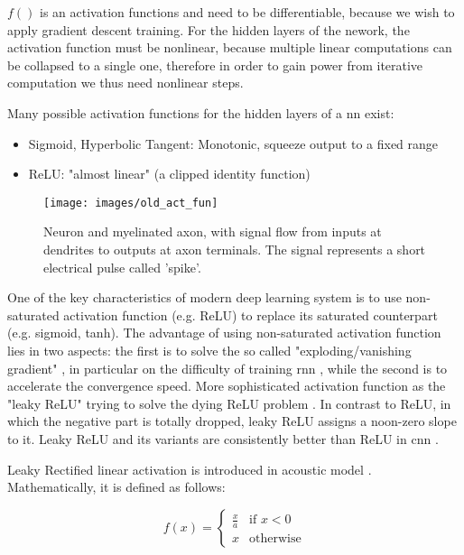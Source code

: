 \noindent $f()$ is an activation functions and need to be differentiable, because we wish to apply gradient descent training. For the hidden layers of the nework, the activation function must be nonlinear, because multiple linear computations can be collapsed to a single one, therefore in order to gain power from iterative computation we thus need nonlinear steps.

\noindent Many possible activation functions for the hidden layers of a \gls{nn} exist:
\begin{itemize}
	\item Sigmoid, Hyperbolic Tangent: Monotonic, squeeze output to a fixed range
	\item ReLU: "almost linear" (a clipped identity function)
\end{itemize}

\begin{figure}[H]
	\centering
	\texttt{[image: images/old\_act\_fun]}
	\caption[Image of a human neuron.]{Neuron and myelinated axon, with signal flow from inputs at dendrites to outputs at axon terminals. The signal represents a short electrical pulse called 'spike'.}
	\label{fig:old_act_fun}
\end{figure}

\noindent One of the key characteristics of modern deep learning system is to use non-saturated activation function (e.g. ReLU) to replace its saturated counterpart (e.g. sigmoid, tanh). The advantage of using non-saturated activation function lies in two aspects: the first is to solve the so called "exploding/vanishing gradient" \cite[]{bengio1994learning}, in particular on the difficulty of training \gls{rnn} \cite[]{pascanu2013difficulty}, while the second is to accelerate the convergence speed. More sophisticated activation function as the "leaky ReLU" trying to solve the dying ReLU problem \cite[]{LeakyReL95:online}. In contrast to ReLU, in which the negative part is totally dropped, leaky ReLU assigns a noon-zero slope to it. Leaky ReLU and its variants are consistently better than ReLU in \gls{cnn} \cite[]{xu2015empirical}.

\noindent Leaky Rectified linear activation is introduced in acoustic model \cite[]{maas2013rectifier}. Mathematically, it is defined as follows:

\begin{Equation}[H]
	\centering
	\begin{equation}
 		f(x) = 
			\begin{cases}
			\frac{x}{a} & \text{if $x < 0 $} \\
			x & \text{otherwise}
		\end{cases}
	\end{equation}
	\caption[Leaky Rectified linear activation.]{Function that idetifies input transformation at each step $l$ of the net.}
	\label{eq:activationfun}
\end{Equation}

